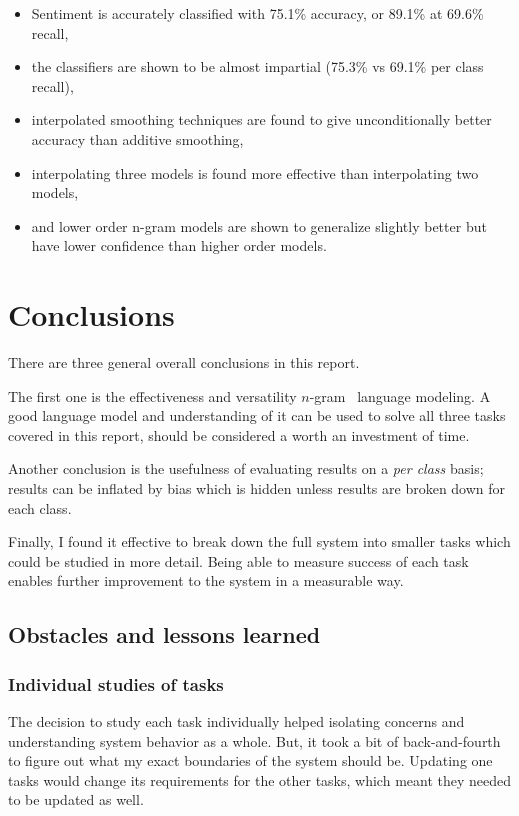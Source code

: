 \documentclass[a4paper,11pt]{kth-mag}
\newcommand{\ngram}{$n$-gram}
\begin{document}
\begin{itemize}
\item Sentiment is accurately classified with 75.1\% accuracy, or 89.1\% at 69.6\% recall,
\item the classifiers are shown to be almost impartial (75.3\% vs 69.1\% per class recall),
\item interpolated smoothing techniques are found to give unconditionally better accuracy than additive smoothing,
\item interpolating three models is found more effective than interpolating two models,
\item and lower order n-gram models are shown to generalize slightly better but have lower confidence than higher order models.
\end{itemize}

\section{Conclusions}

There are three general overall conclusions in this report.

The first one is the effectiveness and versatility \ngram~ language modeling.
A good language model and understanding of it can be used to solve all three
tasks covered in this report, should be considered a worth an investment of time.

Another conclusion is the usefulness of evaluating results on a \emph{per class} basis;
results can be inflated by bias which is hidden unless results are broken down for each class.

Finally, I found it effective to break down the full system into smaller tasks which could be studied in more detail.
Being able to measure success of each task enables further improvement to the system in a measurable way.


\subsection{Obstacles and lessons learned}


\subsubsection{Individual studies of tasks}
The decision to study each task individually helped isolating concerns and understanding system behavior as a whole. But, it took a bit of back-and-fourth to figure out what my exact boundaries of the system should be. Updating one tasks would change its requirements for the other tasks, which meant they needed to be updated as well.
\end{document}
